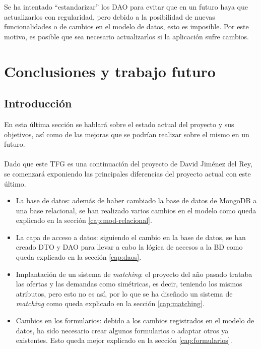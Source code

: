 \documentclass[11pt]{book}
\begin{document}
	Se ha intentado ``estandarizar'' los DAO para evitar que en un futuro haya que actualizarlos con regularidad, pero debido a la posibilidad de nuevas funcionalidades o de cambios en el modelo de datos, esto es imposible. Por este motivo, es posible que sea necesario actualizarlos si la aplicación sufre cambios.
	
	\chapter{Conclusiones y trabajo futuro}
	\section{Introducción}
	En esta última sección se hablará sobre el estado actual del proyecto y sus objetivos, así como de las mejoras que se podrían realizar sobre el mismo en un futuro.\\\\
	
	Dado que este TFG es una continuación del proyecto de David Jiménez del Rey, se comenzará exponiendo las principales diferencias del proyecto actual con este último.
	\begin{itemize}
		\item La base de datos: además de haber cambiado la base de datos de MongoDB a una base relacional, se han realizado varios cambios en el modelo 		como queda explicado en la sección \ref{cap:mod-relacional}.
		\item La capa de acceso a datos: siguiendo el cambio en la base de datos, se han creado DTO y DAO para llevar a cabo la lógica de accesos a la BD 			como queda explicado en la sección \ref{cap:daos}.
		\item Implantación de un sistema de \emph{matching}: el proyecto del año pasado trataba las ofertas y las demandas como simétricas, es decir, teniendo los mismos atributos, pero esto no 	es así, por lo que se ha diseñado un sistema de\emph{ matching} como queda explicado en la sección \ref{cap:matching}.
		\item Cambios en los formularios: debido a los cambios registrados en el modelo de datos, ha sido necesario crear algunos formularios o adaptar otros ya existentes. Esto queda mejor explicado en la sección \ref{cap:formularios}.
	\end{itemize}
	
\end{document}
